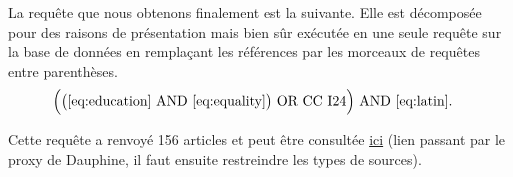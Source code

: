 \documentclass[pagesize, twoside=off, bibliography=totoc, DIV=calc, fontsize=12pt, a4paper, french]{scrartcl}
\begin{document}
La requête que nous obtenons finalement est la suivante. Elle est décomposée pour des raisons de présentation mais bien sûr exécutée en une seule requête sur la base de données en remplaçant les références par les morceaux de requêtes entre parenthèses.
\begin{equation}
  \label{eq:query}
  \left.\begin{aligned}
    &\Bigl(\bigl(\eqref{eq:education} \text{ AND } \eqref{eq:equality}\bigr) \text{ OR CC I24}\Bigr)\text{ AND }\eqref{eq:latin}.
  \end{aligned}\right.
\end{equation}

Cette requête a renvoyé 156 articles et peut être consultée \href{https://search-ebscohost-com.proxy.bu.dauphine.fr/login.aspx?direct=true&db=eoh&bquery=(((TI+(equality+OR+inequality+OR+egalitar*+OR+inegalitar*)+OR+SO+(equality+OR+inequality+OR+egalitar*+OR+inegalitar*)+OR+KW+(equality+OR+inequality+OR+egalitar*+OR+inegalitar*)+OR+AB+(equality+OR+inequality+OR+egalitar*+OR+inegalitar*))+AND+(TI+education+OR+SO+education+OR+KW+education+OR+AB+education))+OR+CC+I24)+AND+(TI+"Latin+America*"+OR+SO+"Latin+America*"+OR+KW+"Latin+America*"+OR+AB+"Latin+America*")}{ici} (lien passant par le proxy de Dauphine, il faut ensuite restreindre les types de sources).


\end{document}
